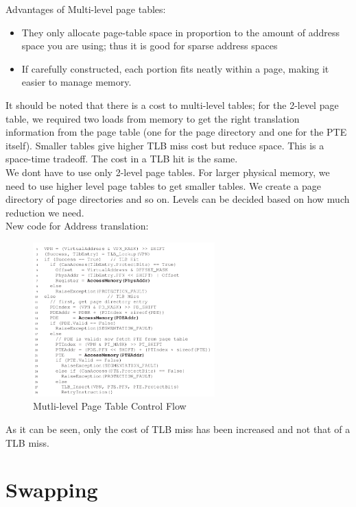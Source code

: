 Advantages of Multi-level page tables:

\begin{itemize}
    \item They only allocate page-table space in proportion to the amount of
        address space you are using; thus it is good for sparse address
        spaces
    \item If carefully constructed, each portion fits neatly within a page,
        making it easier to manage memory.
\end{itemize}

It should be noted that there is a cost to multi-level tables; for the
2-level page table, we required two loads from memory to get the right
translation information from the page table (one for the page directory and
one for the PTE itself). Smaller tables 
give higher TLB miss cost but reduce space.
This is a space-time tradeoff. The cost in a TLB hit is the same.\\

We dont have to use only 2-level page tables. For larger physical memory, 
we need to use higher level page tables to get smaller tables. We create a
page directory of page directories and so on. Levels can be decided based on
how much reduction we need.\\

New code for Address translation:

\begin{figure}[h!]
    \begin{center}
        \includegraphics[width=7cm]{img/206.png}
        \caption{Mutli-level Page Table Control Flow}
    \end{center}
\end{figure}

As it can be seen, only the cost of TLB miss has been increased and not that
of a TLB miss.


\section{Swapping}

